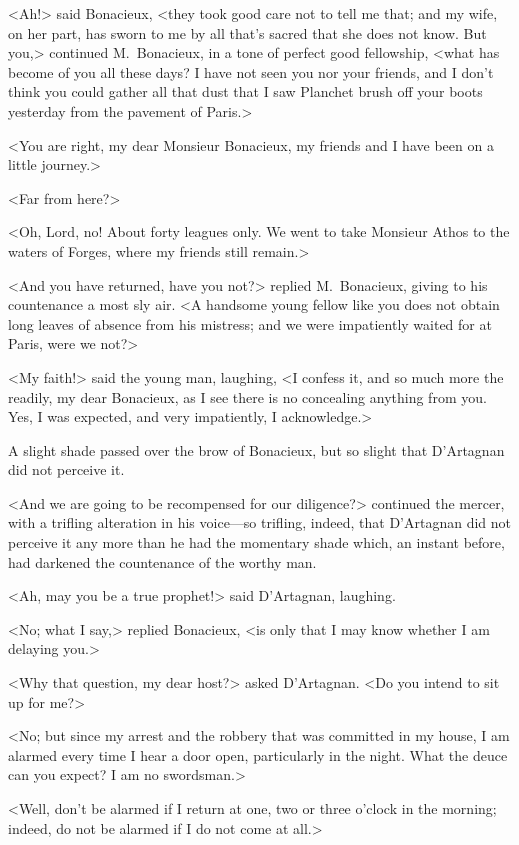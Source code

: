 <Ah!> said Bonacieux, <they took good care not to tell me that; and my wife, on her part, has sworn to me by all that's sacred that she does not know. But you,> continued M.~Bonacieux, in a tone of perfect good fellowship, <what has become of you all these days? I have not seen you nor your friends, and I don't think you could gather all that dust that I saw Planchet brush off your boots yesterday from the pavement of Paris.> 

<You are right, my dear Monsieur Bonacieux, my friends and I have been on a little journey.> 

<Far from here?> 

<Oh, Lord, no! About forty leagues only. We went to take Monsieur Athos to the waters of Forges, where my friends still remain.> 

<And you have returned, have you not?> replied M.~Bonacieux, giving to his countenance a most sly air. <A handsome young fellow like you does not obtain long leaves of absence from his mistress; and we were impatiently waited for at Paris, were we not?> 

<My faith!> said the young man, laughing, <I confess it, and so much more the readily, my dear Bonacieux, as I see there is no concealing anything from you. Yes, I was expected, and very impatiently, I acknowledge.> 

A slight shade passed over the brow of Bonacieux, but so slight that D'Artagnan did not perceive it. 

<And we are going to be recompensed for our diligence?> continued the mercer, with a trifling alteration in his voice—so trifling, indeed, that D'Artagnan did not perceive it any more than he had the momentary shade which, an instant before, had darkened the countenance of the worthy man. 

<Ah, may you be a true prophet!> said D'Artagnan, laughing. 

<No; what I say,> replied Bonacieux, <is only that I may know whether I am delaying you.> 

<Why that question, my dear host?> asked D'Artagnan. <Do you intend to sit up for me?> 

<No; but since my arrest and the robbery that was committed in my house, I am alarmed every time I hear a door open, particularly in the night. What the deuce can you expect? I am no swordsman.> 

<Well, don't be alarmed if I return at one, two or three o'clock in the morning; indeed, do not be alarmed if I do not come at all.> 

